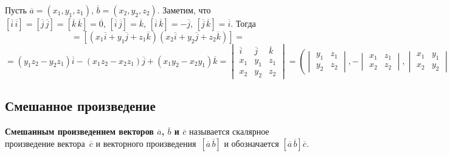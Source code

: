Пусть $\overline a = (x_1, y_1, z_1)$, $\overline b = (x_2, y_2, z_2)$.
Заметим, что $[\overline i\,\overline i] = [\overline j\,\overline j] = [\overline k\,\overline k] = \overline 0$, $[\overline i\,\overline j] = \overline k$, $[\overline i\,\overline k] = -\overline j$, $[\overline j\,\overline k] = \overline i$.
Тогда
\begin{equation*}
[\overline a\,\overline b] =
[(x_1 \overline i + y_1 \overline j + z_1 \overline k)(x_2 \overline i + y_2 \overline j + z_2 \overline k)] =
\end{equation*}
\begin{equation*}
= (y_1 z_2 - y_2 z_1) \overline i - (x_1 z_2 - x_2 z_1) \overline j + (x_1 y_2 - x_2 y_1) \overline k =
\begin{vmatrix}
\overline i & \overline j & \overline k \\
x_1 & y_1 & z_1 \\
x_2 & y_2 & z_2
\end{vmatrix} =
\left(
\begin{vmatrix}
y_1 & z_1 \\
y_2 & z_2
\end{vmatrix},
-\begin{vmatrix}
x_1 & z_1 \\
x_2 & z_2
\end{vmatrix},
\begin{vmatrix}
x_1 & y_1 \\
x_2 & y_2
\end{vmatrix}
\right)
\end{equation*}

\subsection{Смешанное произведение}
 \textbf{Смешанным произведением векторов $\overline a$, $\overline b$ и $\overline c$} называется скалярное произведение вектора~$\overline c$ и векторного произведения~$[\overline a\,\overline b]$ и обозначается $[\overline a\,\overline b] \overline c$.

